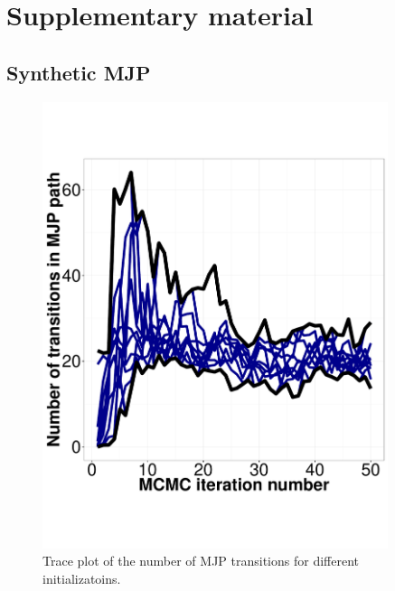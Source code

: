 \section{Supplementary material}

\subsection{Synthetic MJP}

  \begin{figure}%
  \centering
  \begin{minipage}[hp]{0.45\linewidth}
  \centering
    \includegraphics [width=0.90\textwidth, angle=0]{figs/exp3_k2_path_transition.pdf}
      \end{minipage}
    \caption{Trace plot of the number of MJP transitions for different initializatoins.}
	\label{fig:Transition_exp}
  \end{figure}

